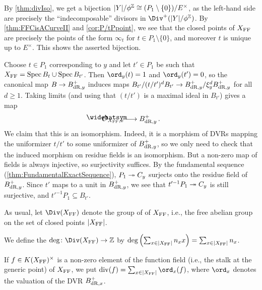 \begin{proof*}
	By \cref{thm:divIso}, we get a bijection $|Y|/\phi^\IZ\cong (P_1\setminus\{0\})/E^\times$, as the left-hand side are precisely the \enquote{indecomposable} divisors in $\Div^+(|Y|/\phi^\IZ)$. By \cref{thm:FFCisACurveII} and \cref{cor:P/tPpoint}, we see that the closed points of $X_{\mathrm{FF}}$ are precisely the points of the form $\infty_t$ for $t\in P_1\setminus\{0\}$, and moreover $t$ is unique up to $E^\times$. This shows the asserted bijection.
	
	Choose $t\in P_1$ corresponding to $y$ and let $t'\in P_1$ be such that $X_{\mathrm{FF}}=\operatorname{Spec} B_t\cup \operatorname{Spec} B_{t'}$. Then $\ord_y(t)=1$ and $\ord_y(t')=0$, so the canonical map $B\morphism B_{\dR,y}^+$ induces maps $B_{t'}/(t/t')^dB_{t'}\morphism B_{\dR,y}^+/\xi_y^dB_{\dR,y}^+$ for all $d\geq 1$. Taking limits (and using that $(t/t')$ is a maximal ideal in $B_{t'}$) gives a map 
	\begin{equation*}
		\roof{\Oo}_{X_\FFC,x}\morphism B_{\dR,y}^+\,.
	\end{equation*}
	We claim that this is an isomorphism. Indeed, it is a morphism of DVRs mapping the uniformizer $t/t'$ to some uniformizer of $B_{\mathrm{dR},y}^+$, so we only need to check that the induced morphism on residue fields is an isomorphism. But a non-zero map of fields is always injective, so surjectivity suffices. By the fundamental sequence (\cref{thm:FundamentalExactSequence}), $P_1\epimorphism C_y$ surjects onto the residue field of $B_{\mathrm{dR},y}^+$. Since $t'$ maps to a unit in $B_{\mathrm{dR},y}^+$, we see that $t'^{-1}P_1\epimorphism C_y$ is still surjective, and $t'^{-1}P_1\subseteq B_{t'}$.
\end{proof*}
\begin{defi}\label{def:deg}
	As usual, let $\Div(X_\FFC)$ denote the group of  of $X_{\mathrm{FF}}$, i.e., the free abelian group on the set of closed points $|X_{\mathrm{FF}}|$.
	\begin{numerate}
		\item We define the  $\deg\colon \Div(X_\FFC)\morphism \IZ$ by $\deg\left(\sum_{x\in |X_{\mathrm{FF}}|}n_xx\right)=\sum_{x\in |X_{\mathrm{FF}}|}n_x$.
		\item If $f\in K(X_{\mathrm{FF}})^\times$ is a non-zero element of the function field (i.e., the stalk at the generic point) of $X_{\mathrm{FF}}$, we put $\div(f)=\sum_{x\in |X_\FFC|}\ord_x(f)$, where $\ord_x$ denotes the valuation of the DVR $B_{\mathrm{dR},x}^+$.
	\end{numerate}
\end{defi}
